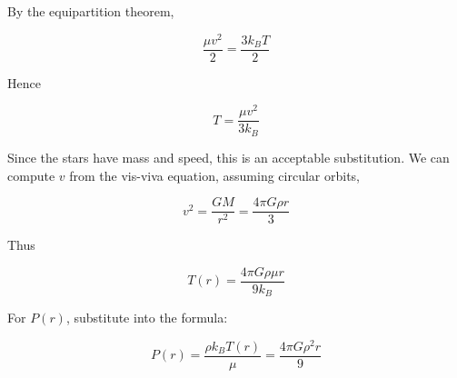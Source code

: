 \documentclass[11pt]{article}
\begin{document}
\begin{pproblem}
\begin{pssolution*}{}{}
\begin{alternativas}
        \item By the equipartition theorem,
        
        \[\frac{\mu v^2}{2} = \frac{3k_B T}{2}\]

        Hence
    
        \[T = \frac{\mu v^2}{3k_B}\]

        Since the stars have mass and speed, this is an acceptable substitution. We can compute \(v\) from the vis-viva equation, assuming circular orbits,

        \[v^2 = \frac{GM}{r^2} = \frac{4\pi G\rho r}{3}\]

        Thus

        \[\boxed{T(r) = \frac{4\pi G \rho \mu r}{9k_B}}\]

        For \(P(r)\), substitute into the formula:

        \[\boxed{P(r) = \frac{\rho k_B T(r)}{\mu} = \frac{4\pi G \rho^2 r}{9}}\]
    \end{alternativas}
    
\end{pssolution*}
\end{pproblem}
\end{document}
